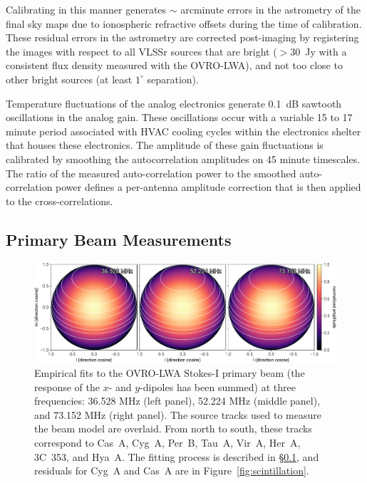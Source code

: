 \documentclass[twocolumn]{aastex61}
\begin{document}
Calibrating in this manner generates $\sim$ arcminute errors in the astrometry of the final sky maps
due to ionospheric refractive offsets during the time of calibration.  These residual errors in the
astrometry are corrected post-imaging by registering the images with respect to all VLSSr
\citep{2014MNRAS.440..327L} sources that are bright ($>30$~Jy with a consistent flux density
measured with the OVRO-LWA), and not too close to other bright sources (at least $1^\circ$
separation).

Temperature fluctuations of the analog electronics generate 0.1~dB sawtooth oscillations in the
analog gain. These oscillations occur with a variable 15 to 17 minute period associated with HVAC
cooling cycles within the electronics shelter that houses these electronics.  The amplitude of these
gain fluctuations is calibrated by smoothing the autocorrelation amplitudes on 45 minute timescales.
The ratio of the measured auto-correlation power to the smoothed auto-correlation power defines a
per-antenna amplitude correction that is then applied to the cross-correlations.

\subsection{Primary Beam Measurements}\label{sec:beam}

\begin{figure}[t]
    \includegraphics[width=\textwidth]{figures/beam/beam}
    \caption{
        Empirical fits to the OVRO-LWA Stokes-I primary beam (the response of the $x$- and
        $y$-dipoles has been summed) at three frequencies: 36.528 MHz (left panel), 52.224 MHz
        (middle panel), and 73.152 MHz (right panel). The source tracks used to measure the beam
        model are overlaid. From north to south, these tracks correspond to Cas~A, Cyg~A, Per~B,
        Tau~A, Vir~A, Her~A, 3C~353, and Hya~A.  The fitting process is described in
        \S\ref{sec:beam}, and residuals for Cyg~A and Cas~A are in Figure~\ref{fig:scintillation}.
    }
    \label{fig:beam}
\end{figure}
\end{document}
